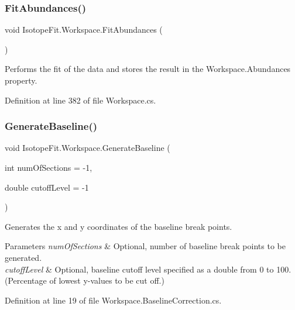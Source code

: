 \subsubsection{\texorpdfstring{Fit\+Abundances()}{FitAbundances()}}
{\footnotesize\ttfamily void Isotope\+Fit.\+Workspace.\+Fit\+Abundances (\begin{DoxyParamCaption}{ }\end{DoxyParamCaption})}



Performs the fit of the data and stores the result in the Workspace.\+Abundances property. 



Definition at line 382 of file Workspace.\+cs.

\mbox{\label{class_isotope_fit_1_1_workspace_a80f09325539d16dd9eee6b470316db8b}} 
\subsubsection{\texorpdfstring{Generate\+Baseline()}{GenerateBaseline()}}
{\footnotesize\ttfamily void Isotope\+Fit.\+Workspace.\+Generate\+Baseline (\begin{DoxyParamCaption}\item[{int}]{num\+Of\+Sections = {\ttfamily -\/1},  }\item[{double}]{cutoff\+Level = {\ttfamily -\/1} }\end{DoxyParamCaption})}



Generates the x and y coordinates of the baseline break points. 


\begin{DoxyParams}{Parameters}
{\em num\+Of\+Sections} & Optional, number of baseline break points to be generated.\\
\hline
{\em cutoff\+Level} & Optional, baseline cutoff level specified as a double from 0 to 100. (Percentage of lowest y-\/values to be cut off.)\\
\hline
\end{DoxyParams}


Definition at line 19 of file Workspace.\+Baseline\+Correction.\+cs.

\mbox{\label{class_isotope_fit_1_1_workspace_ab0a9cd936dbf16b3bad1e34a11c2ddb1}} 
